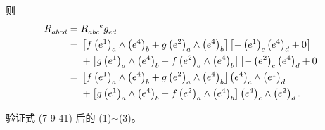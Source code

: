 \begin{xiti}
\begin{zm}
\begin{Proof}
\begin{equation*}
				\end{equation*}
				则
				\begin{equation*}
					\begin{split}
						\tensor{R}{_a_b_c_d} ={}& \tensor{R}{_a_b_c^e} \tensor{g}{_e_d}\\
						={}& \left[ f \tensor{\left( e^1 \right)}{_a} \wedge \tensor{\left( e^4 \right)}{_b} + g \tensor{\left( e^2 \right)}{_a} \wedge \tensor{\left( e^4 \right)}{_b} \right] \left[ - \tensor{\left( e^1 \right)}{_c} \tensor{\left( e^4 \right)}{_d} + 0 \right]\\
						&{}+ \left[ g \tensor{\left( e^1 \right)}{_a} \wedge \tensor{\left( e^4 \right)}{_b} - f \tensor{\left( e^2 \right)}{_a} \wedge \tensor{\left( e^4 \right)}{_b} \right] \left[ - \tensor{\left( e^2 \right)}{_c} \tensor{\left( e^4 \right)}{_d} + 0 \right]\\
						={}& \left[ f \tensor{\left( e^1 \right)}{_a} \wedge \tensor{\left( e^4 \right)}{_b} + g \tensor{\left( e^2 \right)}{_a} \wedge \tensor{\left( e^4 \right)}{_b} \right] \tensor{\left( e^4 \right)}{_c} \wedge \tensor{\left( e^1 \right)}{_d}\\
						& {}+ \left[ g \tensor{\left( e^1 \right)}{_a} \wedge \tensor{\left( e^4 \right)}{_b} - f \tensor{\left( e^2 \right)}{_a} \wedge \tensor{\left( e^4 \right)}{_b} \right] \tensor{\left( e^4 \right)}{_c} \wedge \tensor{\left( e^2 \right)}{_d}.
					\end{split}
				\end{equation*}
			\end{Proof}
		\end{zm}

	\item 验证式 (7-9-41) 后的 (1)$\sim$(3)。
	

\end{xiti}
